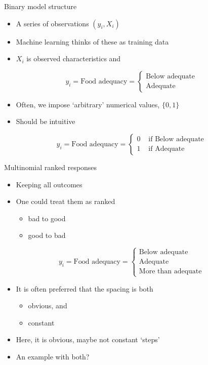 \documentclass[
  ignorenonframetext,
]{beamer}
\providecommand{\tightlist}{%
  \setlength{\itemsep}{0pt}\setlength{\parskip}{0pt}}
\begin{document}
\begin{frame}{Binary model structure}
\protect{}\label{binary-model-structure}
\begin{itemize}
\tightlist
\item
  A series of observations \((y_i,X_i)\)
\item
  Machine learning thinks of these as training data
\item
  \(X_i\) is observed characteristics and
\end{itemize}

\[
y_i =  \text{Food adequacy} = \begin{cases}
\text{Below adequate} \\
\text{Adequate}
\end{cases}
\]

\begin{itemize}
\tightlist
\item
  Often, we impose `arbitrary' numerical values, \(\{0, 1 \}\)
\item
  Should be intuitive
\end{itemize}

\[
y_i =  \text{Food adequacy} = \begin{cases}
0 & \text{ if Below adequate} \\
1 & \text{ if Adequate}
\end{cases}
\]
\end{frame}

\begin{frame}{Multinomial ranked responses}
\protect{}\label{multinomial-ranked-responses}
\begin{itemize}
\tightlist
\item
  Keeping all outcomes
\item
  One could treat them as ranked

  \begin{itemize}
  \tightlist
  \item
    bad to good
  \item
    good to bad
  \end{itemize}
\end{itemize}

\[
y_i = \text{Food adequacy} = \begin{cases}
\text{Below adequate} \\
\text{Adequate} \\
\text{More than adequate}
\end{cases}
\]

\begin{itemize}
\tightlist
\item
  It is often preferred that the spacing is both

  \begin{itemize}
  \tightlist
  \item
    obvious, and
  \item
    constant
  \end{itemize}
\item
  Here, it is obvious, maybe not constant `steps'
\item
  An example with both?
\end{itemize}
\end{frame}
\end{document}
